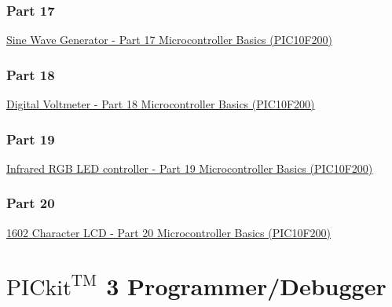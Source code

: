 \documentclass[12pt, letterpaper]{article}
\begin{document}
\subsubsection{Part 17}
\href{https://www.circuitbread.com/tutorials/sine-wave-generator-part-17-microcontroller-basics-pic10f200}{Sine Wave Generator - Part 17 Microcontroller Basics (PIC10F200)}\\
\subsubsection{Part 18}
\href{https://www.circuitbread.com/tutorials/digital-voltmeter-part-18-microcontroller-basics-pic10f200}{Digital Voltmeter - Part 18 Microcontroller Basics (PIC10F200)}\\
\subsubsection{Part 19}
\href{https://www.circuitbread.com/tutorials/infrared-rgb-led-controller-part-19-microcontroller-basics-pic10f200}{Infrared RGB LED controller - Part 19 Microcontroller Basics (PIC10F200)}\\
\subsubsection{Part 20}
\href{https://www.circuitbread.com/tutorials/1602-character-lcd-part-20-microcontroller-basics-pic10f200?token=he8HKfRsVXpEyyyeqTTF}{1602 Character LCD - Part 20 Microcontroller Basics (PIC10F200)}

\section{$\text{PICkit}^{\text{TM}}$ 3 Programmer/Debugger}
\end{document}
